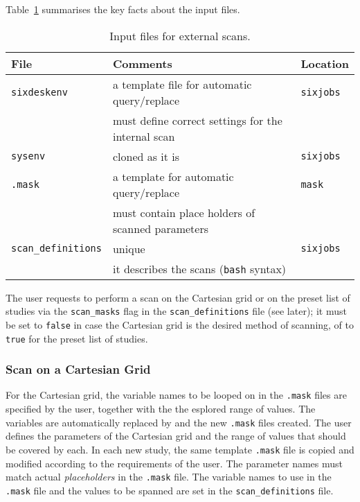 Table~\ref{tab:ExternalScanInputFile} summarises the key facts about the
input files.
\begin{table}[h]
\begin{center}
    \caption{Input files for external scans.}
    \label{tab:ExternalScanInputFile}
    \begin{tabular}{|l|l|l|}
    \hline
    \rowcolor{blue!30}
    \textbf{File} & \textbf{Comments} & \textbf{Location} \\
    \hline
    \texttt{sixdeskenv} & a template file for automatic query/replace
    & \texttt{sixjobs} \\
    & must define correct settings for the internal scan & \\
    \texttt{sysenv} & cloned as it is & \texttt{sixjobs} \\
    \texttt{.mask} & a template for automatic query/replace & \texttt{mask} \\
    & must contain place holders of scanned parameters & \\
    \texttt{scan\_definitions} & unique & \texttt{sixjobs} \\
    & it describes the scans (\texttt{bash} syntax) & \\
    \hline
    \end{tabular}
\end{center}
\end{table}

The user requests \SIXDESK{} to perform a scan on the Cartesian grid
or on the preset list of studies via the \texttt{scan\_masks} flag
in the \texttt{scan\_definitions} file (see later); it must be
set to \texttt{false} in case the Cartesian grid is the desired
method of scanning, of to \texttt{true} for the preset list of studies.

\subsubsection{Scan on a Cartesian Grid}
For the Cartesian grid, the variable names to be looped on in the
\texttt{.mask} files are specified by the user, together with the
the esplored range of values. The variables are automatically replaced
by \SIXDESK{} and the new \texttt{.mask} files created. The user defines
the parameters of the Cartesian grid and the range of values that should be
covered by each. In each new study, the same template \texttt{.mask}
file is copied and modified according to the requirements of the user.
The parameter names must match actual \emph{placeholders} in the
\texttt{.mask} file. The variable names to use in the \texttt{.mask}
file and the values to be spanned are set in the \texttt{scan\_definitions}
file.

